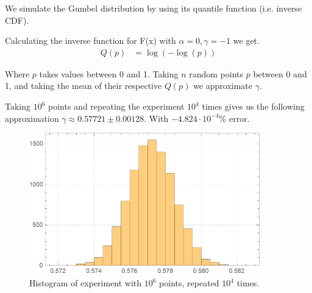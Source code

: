 \documentclass[12pt]{article}
\numberwithin{equation}{section}
\begin{document}
We simulate the Gumbel distribution by using its quantile function (i.e. inverse CDF).
\par Calculating the inverse function for F(x) with $\alpha=0, \gamma=-1$ we get.
\begin{align}
   Q(p)&= \log \left(- \log \left(p\right)\right)
\end{align}
\par Where $p$ takes values between 0 and 1. Taking $n$ random points $p$ between 0 and 1, and taking the mean of their respective $Q(p)$ we approximate $\gamma$.
\par Taking $10^6$ points and repeating the experiment $10^4$ times gives us the following approximation $\gamma \approx 0.57721 \pm 0.00128$. With $-4.824 \cdot 10^{-4} \%$ error.
\begin{figure}[!htb]
    \centering
    \includegraphics[width=10cm]{Images/repeatedgamma.png}
    \caption{Histogram of experiment with $10^6$ points, repeated $10^4$ times.}
    \label{fig:repeatedgamma}
\end{figure}
\FloatBarrier
\end{document}
